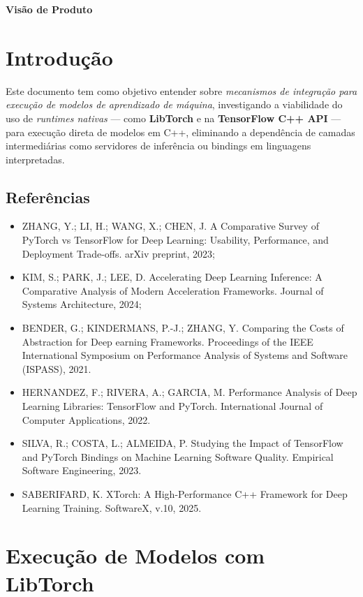 \begin{center}
    \textbf{\Huge Visão de Produto}
\end{center}

\section{Introdução}

Este documento tem como objetivo entender sobre \textit{mecanismos de integração
para execução de modelos de aprendizado de máquina}, investigando a viabilidade do uso
de \textit{runtimes nativas} — como  \textbf{LibTorch} e na \textbf{TensorFlow C++ API} —
para execução direta de modelos em C++, eliminando a dependência de camadas intermediárias
como servidores de inferência ou bindings em linguagens interpretadas.


\subsection{Referências}

\begin{itemize}
   \item ZHANG, Y.; LI, H.; WANG, X.; CHEN, J. A Comparative Survey of PyTorch vs TensorFlow for Deep Learning: Usability, Performance, and Deployment Trade-offs. arXiv preprint, 2023;
   \item KIM, S.; PARK, J.; LEE, D. Accelerating Deep Learning Inference: A Comparative Analysis of Modern Acceleration Frameworks. Journal of Systems Architecture, 2024;
   \item BENDER, G.; KINDERMANS, P.-J.; ZHANG, Y. Comparing the Costs of Abstraction for Deep earning Frameworks. Proceedings of the IEEE International Symposium on Performance Analysis of Systems and Software (ISPASS), 2021.
   \item HERNANDEZ, F.; RIVERA, A.; GARCIA, M. Performance Analysis of Deep Learning Libraries: TensorFlow and PyTorch. International Journal of Computer Applications, 2022.
   \item SILVA, R.; COSTA, L.; ALMEIDA, P. Studying the Impact of TensorFlow and PyTorch Bindings on Machine Learning Software Quality. Empirical Software Engineering, 2023.
   \item SABERIFARD, K. XTorch: A High-Performance C++ Framework for Deep Learning Training. SoftwareX, v.10, 2025.
\end{itemize}

\section{Execução de Modelos com LibTorch}


